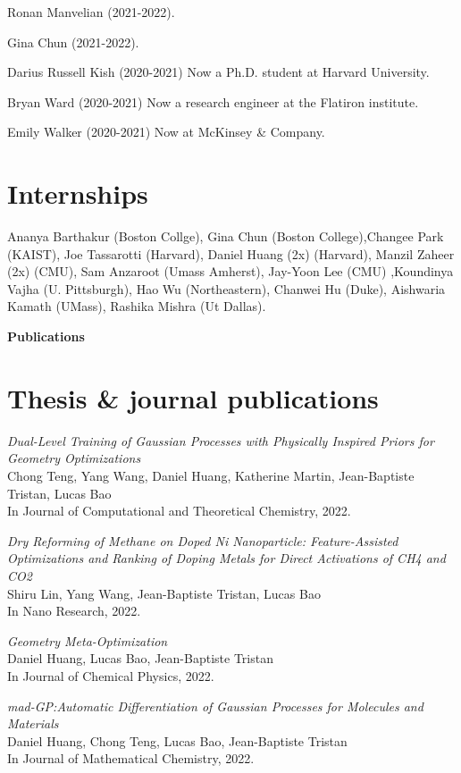 \documentclass[margin,line]{res}
\begin{document}
\begin{resume}
Ronan Manvelian (2021-2022).

Gina Chun (2021-2022).

Darius Russell Kish (2020-2021) \hfill Now a Ph.D. student at Harvard University.

Bryan Ward (2020-2021) \hfill Now a research engineer at the Flatiron institute.

Emily Walker (2020-2021) \hfill Now at McKinsey \& Company.

\section{\sc Internships}

Ananya Barthakur (Boston Collge), Gina Chun (Boston College),Changee
Park (KAIST), Joe Tassarotti (Harvard), Daniel Huang (2x) (Harvard),
Manzil Zaheer (2x) (CMU), Sam Anzaroot (Umass Amherst), Jay-Yoon Lee
(CMU) ,Koundinya Vajha (U. Pittsburgh), Hao Wu (Northeastern), Chanwei
Hu (Duke), Aishwaria Kamath (UMass), Rashika Mishra (Ut Dallas).

\newpage
  {\bf {\Large Publications}}

\section{\sc Thesis \& journal publications}

\emph{Dual-Level Training of Gaussian Processes with Physically Inspired Priors for Geometry Optimizations}\\
Chong Teng, Yang Wang, Daniel Huang, Katherine Martin, Jean-Baptiste Tristan, Lucas Bao\\
In Journal of Computational and Theoretical Chemistry, 2022.

\emph{Dry Reforming of Methane on Doped Ni Nanoparticle:
  Feature-Assisted Optimizations and Ranking of Doping Metals for
  Direct Activations of CH4 and CO2}\\
Shiru Lin, Yang Wang, Jean-Baptiste Tristan, Lucas Bao\\
In Nano Research, 2022.

\emph{Geometry Meta-Optimization}\\
Daniel Huang, Lucas Bao, Jean-Baptiste Tristan\\
In Journal of Chemical Physics, 2022.

\emph{mad-GP:Automatic Differentiation of Gaussian Processes for Molecules and Materials}\\
Daniel Huang, Chong Teng, Lucas Bao, Jean-Baptiste Tristan\\
In Journal of Mathematical Chemistry, 2022.


\end{resume}
\end{document}
